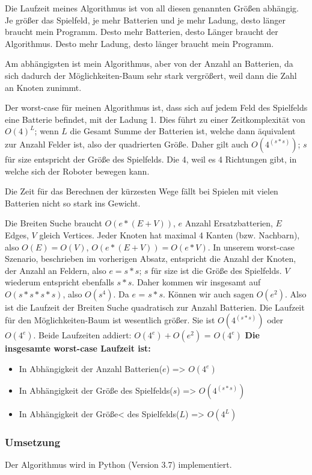 \documentclass[a4paper,12pt,arial]{scrartcl}
\begin{document}
Die Laufzeit meines Algorithmus ist von all diesen genannten Größen abhängig.
Je größer das Spielfeld, je mehr Batterien und je mehr Ladung, desto länger braucht mein Programm.
Desto mehr Batterien, desto Länger braucht der Algorithmus.
Desto mehr Ladung, desto länger braucht mein Programm.
\par
Am abhängigsten ist mein Algorithmus, aber von der Anzahl an Batterien, da sich dadurch der Möglichkeiten-Baum sehr stark vergrößert, weil dann die Zahl an Knoten zunimmt.
\par
Der worst-case für meinen Algorithmus ist, dass sich auf jedem Feld des Spielfelds eine Batterie befindet, mit der Ladung 1. Dies führt zu einer Zeitkomplexität von $O(4)^L$; wenn $L$ die Gesamt Summe der Batterien ist, welche dann äquivalent zur Anzahl Felder ist, also der quadrierten Größe. Daher gilt auch $O(4^(s*s))$; $s$für size entspricht der Größe des Spielfelds.
Die 4, weil es 4 Richtungen gibt, in welche sich der Roboter bewegen kann.
\par
Die Zeit für das Berechnen der kürzesten Wege fällt bei Spielen mit vielen Batterien nicht so stark ins Gewicht.\par
Die Breiten Suche braucht $O(e * (E + V))$, $e$ Anzahl Ersatzbatterien, $E$ Edges, $V$ gleich Vertices. Jeder Knoten hat maximal 4 Kanten (bzw. Nachbarn), also $O(E) = O(V)$, $O(e * (E+V)) = O(e * V)$. In unserem worst-case Szenario, beschrieben im vorherigen Absatz, entspricht die Anzahl der Knoten, der Anzahl an Feldern, also $e=s*s$; $s$ für size ist die Größe des Spielfelds.
$V$ wiederum entspricht ebenfalls $s*s$. Daher kommen wir insgesamt auf $O(s*s*s*s)$,
also $O(s^4)$. Da $e$ = $s * s$. Können wir auch sagen $O(e^2)$. Also ist die Laufzeit der Breiten Suche quadratisch zur Anzahl Batterien.
Die Laufzeit für den Möglichkeiten-Baum ist wesentlich größer.
Sie ist $O(4^(s*s))$ oder $O(4^e)$.
Beide Laufzeiten addiert: $O(4^e) + O(e^2)$ = $O(4^e)$
\textbf{Die insgesamte worst-case Laufzeit ist:}
\begin{itemize}
\item In Abhängigkeit der Anzahl Batterien($e$) => \texttt{$O(4^e)$}
\item In Abhängigkeit der Größe des Spielfelds($s$) => \texttt{$O(4^(s*s))$}
\item In Abhängigkeit der Größe< des Spielfelds($L$) => \texttt{$O(4^L)$}
\end{itemize}
\subsubsection{Umsetzung}
Der Algorithmus wird in Python (Version 3.7) implementiert.
\end{document}
